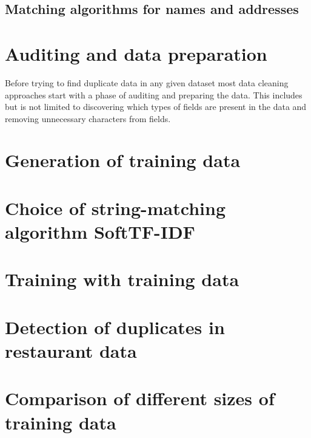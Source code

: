 \documentclass[conference]{IEEEtran}
\begin{document}
\subsection{Matching algorithms for names and addresses}

\section{Auditing and data preparation}\label{prep}
Before trying to find duplicate data in any given dataset most data cleaning approaches start with a phase of auditing and preparing the data. This includes but is not limited to discovering which types of fields are present in the data and removing unnecessary characters from fields.

\section{Generation of training data}\label{train_gen}

\section{Choice of string-matching algorithm SoftTF-IDF}\label{matching}

\section{Training with training data}\label{training}

\section{Detection of duplicates in restaurant data}\label{duplicate_detection}

\section{Comparison of different sizes of training data}\label{comparison}
\end{document}

